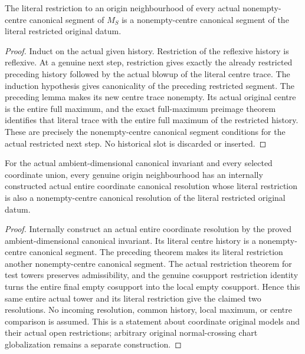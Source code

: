 \begin{theorem}
\label{hir:homogeneous-origin-neighbourhood-nonempty-canonical-history}
The literal restriction to an origin neighbourhood of every actual
nonempty-centre canonical segment of $M_S$ is a nonempty-centre
canonical segment of the literal restricted original datum.
\leanok
{}
\end{theorem}
\begin{proof}
Induct on the actual given history. Restriction of the reflexive
history is reflexive. At a genuine next step, restriction gives
exactly the already restricted preceding history followed by the
actual blowup of the literal centre trace. The induction hypothesis
gives canonicality of the preceding restricted segment. The preceding
lemma makes its new centre trace nonempty. Its actual original centre
is the entire full maximum, and the exact full-maximum preimage theorem
identifies that literal trace with the entire full maximum of the
restricted history. These are precisely the nonempty-centre canonical
segment conditions for the actual restricted next step. No historical
slot is discarded or inserted.
\end{proof}

\begin{theorem}
\label{hir:homogeneous-common-coordinate-resolution-origin-neighbourhood}
For the actual ambient-dimensional canonical invariant and every
selected coordinate union, every genuine origin neighbourhood has an
internally constructed actual entire coordinate canonical resolution
whose literal restriction is also a nonempty-centre canonical
resolution of the literal restricted original datum.
\leanok
{}
\end{theorem}
\begin{proof}
Internally construct an actual entire coordinate resolution by the
proved ambient-dimensional canonical invariant. Its literal centre
history is a nonempty-centre canonical segment. The preceding theorem
makes its literal restriction another nonempty-centre canonical
segment. The actual restriction theorem for test towers preserves
admissibility, and the genuine cosupport restriction identity turns
the entire final empty cosupport into the local empty cosupport.
Hence this same entire actual tower and its literal restriction give
the claimed two resolutions. No incoming resolution, common history,
local maximum, or centre comparison is assumed. This is a statement
about coordinate original models and their actual open restrictions;
arbitrary original normal-crossing chart globalization remains a
separate construction.
\end{proof}
